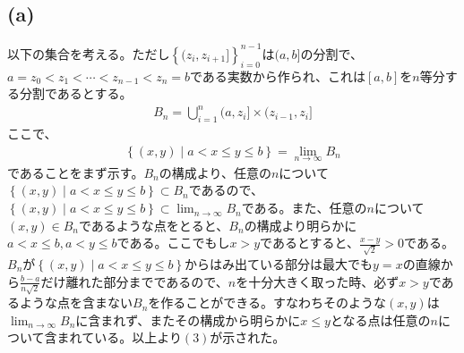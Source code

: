 \documentclass{article}
\begin{document}
\subsection{(a)}
以下の集合を考える。ただし$\left\{ (z_i ,z_{i+1}] \right\}_{i = 0}^{n-1}$は$(a, b]$の分割で、$a = z_0 < z_1 < \cdots < z_{n-1} < z_n = b$である実数から作られ、これは$[a,b]$を$n$等分する分割であるとする。
\begin{align*}
	B_n = \bigcup_{i = 1}^n (a, z_i] \times (z_{i-1}, z_i]
\end{align*}
ここで、
\begin{align}
	\left\{ (x, y) \mid a < x \leq y \leq b \right\} = \lim_{n\to \infty} B_n
\end{align}
であることをまず示す。$B_n$の構成より、任意の$n$について$\left\{ (x, y) \mid a < x \leq y \leq b \right\} \subset B_n$であるので、$\left\{ (x, y) \mid a < x \leq y \leq b \right\} \subset \lim_{n\to \infty} B_n$である。また、任意の$n$について$(x, y) \in B_n$であるような点をとると、$B_n$の構成より明らかに$a < x \leq b, a < y \leq b$である。ここでもし$x > y$であるとすると、$\frac{x-y}{\sqrt{2}} > 0$である。$B_n$が$\left\{ (x, y) \mid a < x \leq y \leq b \right\}$からはみ出ている部分は最大でも$y = x$の直線から$\frac{b-a}{n\sqrt{2}}$だけ離れた部分までであるので、$n$を十分大きく取った時、必ず$x > y$であるような点を含まない$B_n$を作ることができる。すなわちそのような$(x, y)$は$\lim_{n\to \infty} B_n$に含まれず、またその構成から明らかに$x\leq y$となる点は任意の$n$について含まれている。以上より$(3)$が示された。
\end{document}
